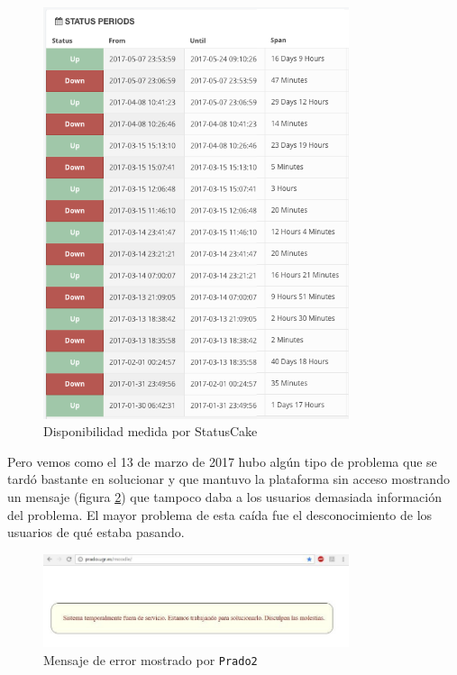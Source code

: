 \begin{figure}[h!]
\centering
\includegraphics[width=0.8\textwidth]{../screenshots/statuscake1}
\caption{Disponibilidad medida por StatusCake}
\label{fig:statuscake1}
\end{figure}

\bigskip
Pero vemos como el 13 de marzo de 2017 hubo algún tipo de problema que se tardó bastante en solucionar y que mantuvo la plataforma sin acceso mostrando un mensaje (figura \ref{fig:pradocaido}) que tampoco daba a los usuarios demasiada información del problema. El mayor problema de esta caída fue el desconocimiento de los usuarios de qué estaba pasando.

\begin{figure}[h!]
\centering
\includegraphics[width=0.8\textwidth]{../images/pradocaido}
\caption{Mensaje de error mostrado por \texttt{Prado2}}
\label{fig:pradocaido}
\end{figure}

